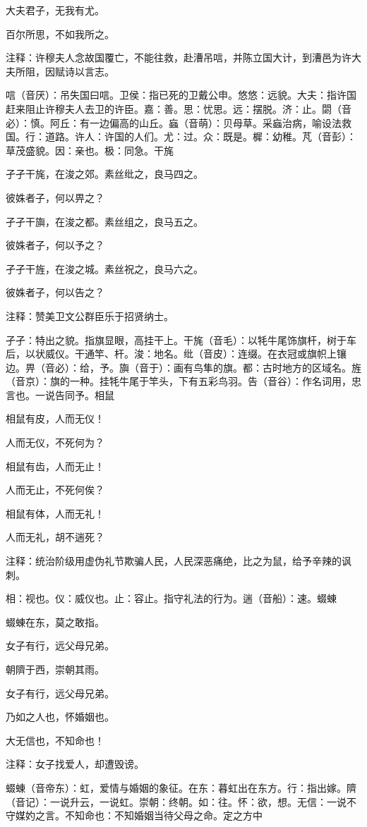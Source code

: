 \documentclass[12pt,UTF8]{ctexbook}
\begin{document}
大夫君子，无我有尤。

百尔所思，不如我所之。

注释：许穆夫人念故国覆亡，不能往救，赴漕吊唁，并陈立国大计，到漕邑为许大夫所阻，因赋诗以言志。

唁（音厌）：吊失国曰唁。卫侯：指已死的卫戴公申。悠悠：远貌。大夫：指许国赶来阻止许穆夫人去卫的许臣。嘉：善。思：忧思。远：摆脱。济：止。閟（音必）：慎。阿丘：有一边偏高的山丘。蝱（音萌）：贝母草。采蝱治病，喻设法救国。行：道路。许人：许国的人们。尤：过。众：既是。樨：幼稚。芃（音彭）：草茂盛貌。因：亲也。极：同急。干旄

孑孑干旄，在浚之郊。素丝纰之，良马四之。

彼姝者子，何以畀之？

孑孑干旟，在浚之都。素丝组之，良马五之。

彼姝者子，何以予之？

孑孑干旌，在浚之城。素丝祝之，良马六之。

彼姝者子，何以告之？

注释：赞美卫文公群臣乐于招贤纳士。

孑孑：特出之貌。指旗显眼，高挂干上。干旄（音毛）：以牦牛尾饰旗杆，树于车后，以状威仪。干通竿、杆。浚：地名。纰（音皮）：连缀。在衣冠或旗帜上镶边。畀（音必）：给，予。旟（音于）：画有鸟隼的旗。都：古时地方的区域名。旌（音京）：旗的一种。挂牦牛尾于竿头，下有五彩鸟羽。告（音谷）：作名词用，忠言也。一说告同予。相鼠

相鼠有皮，人而无仪！

人而无仪，不死何为？

相鼠有齿，人而无止！

人而无止，不死何俟？

相鼠有体，人而无礼！

人而无礼，胡不遄死？

注释：统治阶级用虚伪礼节欺骗人民，人民深恶痛绝，比之为鼠，给予辛辣的讽刺。

相：视也。仪：威仪也。止：容止。指守礼法的行为。遄（音船）：速。蝃蝀

蝃蝀在东，莫之敢指。

女子有行，远父母兄弟。

朝隮于西，崇朝其雨。

女子有行，远父母兄弟。

乃如之人也，怀婚姻也。

大无信也，不知命也！

注释：女子找爱人，却遭毁谤。

蝃蝀（音帝东）：虹，爱情与婚姻的象征。在东：暮虹出在东方。行：指出嫁。隮（音记）：一说升云，一说虹。崇朝：终朝。如：往。怀：欲，想。无信：一说不守媒妁之言。不知命也：不知婚姻当待父母之命。定之方中
\end{document}

